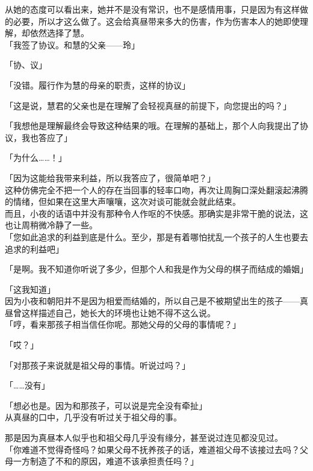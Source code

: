 从她的态度可以看出来，她并不是没有常识，也不是感情用事，只是因为有这样做的必要，所以才这么做了。这会给真昼带来多大的伤害，作为伤害本人的她即使理解，却依然选择了慧。\\

「我签了协议。和慧的父亲——玲」

「协、议」

「没错。履行作为慧的母亲的职责，这样的协议」

「这是说，慧君的父亲也是在理解了会轻视真昼的前提下，向您提出的吗？」

「我想他是理解最终会导致这种结果的哦。在理解的基础上，那个人向我提出了协议，我也答应了」

「为什么……！」

「因为这能给我带来利益，所以我答应了，很简单吧？」\\

这种仿佛完全不把一个人的存在当回事的轻率口吻，再次让周胸口深处翻滚起沸腾的情绪，但如果在这里大声嚷嚷，这次对谈可能就会就此结束。\\

而且，小夜的话语中并没有那种令人作呕的不快感。那确实是非常干脆的说法，这也让周稍微冷静了一些。\\

「您如此追求的利益到底是什么。至少，那是有着哪怕扰乱一个孩子的人生也要去追求的利益吧」

「是啊。我不知道你听说了多少，但那个人和我是作为父母的棋子而结成的婚姻」

「这我知道」\\

因为小夜和朝阳并不是因为相爱而结婚的，所以自己是不被期望出生的孩子——真昼曾这样描述自己，她长大的环境也让她不得不这么说。\\

「哼，看来那孩子相当信任你呢。那她父母的父母的事情呢？」

「哎？」

「对那孩子来说就是祖父母的事情。听说过吗？」

「……没有」

「想必也是。因为和那孩子，可以说是完全没有牵扯」\\

从真昼的口中，几乎没有听过关于祖父母的事。

那是因为真昼本人似乎也和祖父母几乎没有缘分，甚至说过连见都没见过。\\

「你难道不觉得奇怪吗？如果父母不抚养孩子的话，难道祖父母不该接过去吗？父母一方制造了不和的原因，难道不该承担责任吗？」

